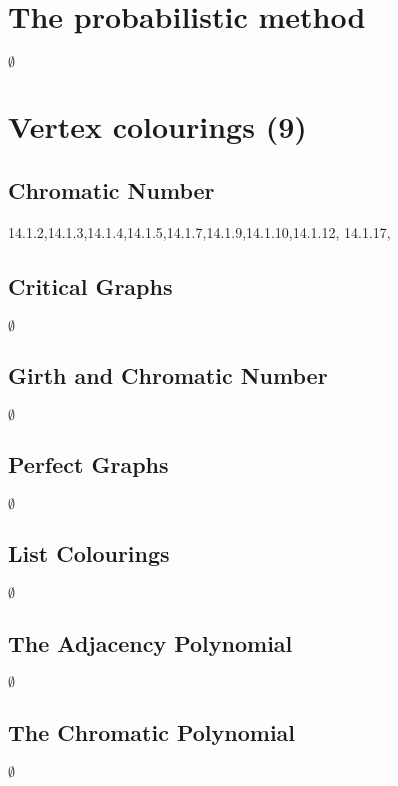 \documentclass[12pt]{article}
\begin{document}
\newpage

\section{The probabilistic method}

$\emptyset$

\section{Vertex colourings (9)}

\subsection{Chromatic Number}

14.1.2,14.1.3,14.1.4,14.1.5,14.1.7,14.1.9,14.1.10,14.1.12,
14.1.17,

\subsection{Critical Graphs}

$\emptyset$

\subsection{Girth and Chromatic Number}

$\emptyset$

\subsection{Perfect Graphs}

$\emptyset$

\subsection{List Colourings}

$\emptyset$

\subsection{The Adjacency Polynomial}

$\emptyset$

\subsection{The Chromatic Polynomial}

$\emptyset$
\end{document}
